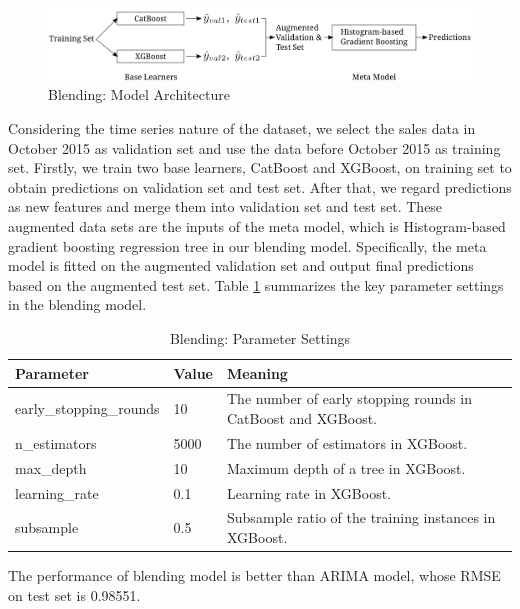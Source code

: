 \documentclass{article}
\begin{document}
\begin{figure}[!ht]
    \centering
    \includegraphics[width=16cm]{./figs/blending.png}
    \caption{Blending: Model Architecture}
    \label{fig:blending}
\end{figure}

Considering the time series nature of the dataset, we select the sales data in October 2015 as validation set and use the data before October 2015 as training set. Firstly, we train two base learners, CatBoost and XGBoost, on training set to obtain predictions on validation set and test set. After that, we regard predictions as new features and merge them into validation set and test set. These augmented data sets are the inputs of the meta model, which is Histogram-based gradient boosting regression tree in our blending model. Specifically, the meta model is fitted on the augmented validation set and output final predictions based on the augmented test set. Table \ref{tab:blending} summarizes the key parameter settings in the blending model. \par

\begin{table}[!ht]
    \centering
    \caption{Blending: Parameter Settings}
    \label{tab:blending}
    \begin{tabular}{lll}
        \toprule
        \textbf{Parameter} & \textbf{Value} & \textbf{Meaning}\\
        \midrule
        early\_stopping\_rounds & 10 & The number of early stopping rounds in CatBoost and XGBoost.\\
        n\_estimators & 5000 & The number of estimators in XGBoost.\\
        max\_depth & 10 & Maximum depth of a tree in XGBoost.\\
        learning\_rate & 0.1 & Learning rate in XGBoost.\\
        subsample & 0.5 & Subsample ratio of the training instances in XGBoost.\\
        \bottomrule
    \end{tabular}
\end{table}

The performance of blending model is better than ARIMA model, whose RMSE on test set is 0.98551.
\end{document}
